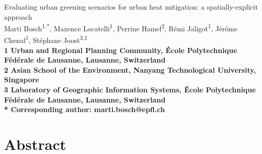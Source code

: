 \documentclass[10pt,letterpaper]{article}
\begin{document}
\vspace*{0.35in}



\begin{flushleft}
  {
    \Large Evaluating urban greening scenarios for urban heat mitigation: a spatially-explicit approach
    \textbf\newline{}
  }
  \newline
  \\
  Mart\'i Bosch\textsuperscript{1,*},
  Maxence Locatelli\textsuperscript{1},
  Perrine Hamel\textsuperscript{2},
  R\'emi Jaligot\textsuperscript{1},
  J\'er\^ome Chenal\textsuperscript{1},
  St\'ephane Joost\textsuperscript{3,1}
  \\
  \bigskip
  \bf{1} Urban and Regional Planning Community, \'Ecole Polytechnique F\'ed\'erale de Lausanne, Lausanne, Switzerland
  \\ 
  \bf{2} Asian School of the Environment, Nanyang Technological University, Singapore
  \\
  \bf{3} Laboratory of Geographic Information Systems, \'Ecole Polytechnique F\'ed\'erale de Lausanne, Lausanne, Switzerland
  \\
  \bigskip
  \bf{*} Corresponding author: marti.bosch@epfl.ch

\end{flushleft}

\section*{Abstract}
\end{document}
